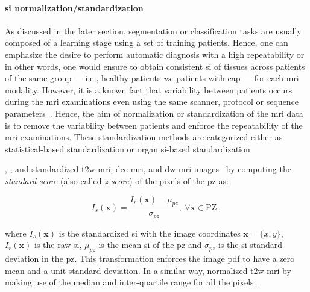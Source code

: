 \paragraph{\Ac{si} normalization/standardization} As discussed in the later section, segmentation or classification tasks are usually composed of a learning stage using a set of training patients.
Hence, one can emphasize the desire to perform automatic diagnosis with a high repeatability or in other words, one would ensure to obtain consistent \ac{si} of tissues across patients of the same group --- i.e., healthy patients \textit{vs.} patients with \ac{cap} --- for each \ac{mri} modality.
However, it is a known fact that variability between patients occurs during the \ac{mri} examinations even using the same scanner, protocol or sequence parameters~\cite{Nyul1999}.
Hence, the aim of normalization or standardization of the \ac{mri} data is to remove the variability between patients and enforce the repeatability of the \ac{mri} examinations.
These standardization methods are categorized either as statistical-based standardization or organ \ac{si}-based standardization

\citeauthor{Artan2010}, \citeauthor{Ozer2010}, and \citeauthor{rampun2016quantitative} standardized \ac{t2w}-\ac{mri}, \ac{dce}-\ac{mri}, and \ac{dw}-\ac{mri} images~\cite{Artan2009,Artan2010,Ozer2009,Ozer2010,rampun2015classifying,rampun2015computer,rampun2016computer,rampun2016computerb,rampun2016quantitative} by computing the \textit{standard score} (also called \textit{z-score}) of the pixels of the \ac{pz} as:

\begin{equation}
	I_s(\mathbf{x}) = \frac{ I_r(\mathbf{x}) - \mu_{pz}}{\sigma_{pz}}, \ \forall \mathbf{x} \in \text{PZ} \ ,
	\label{eq:meansta}
\end{equation}

\noindent where $I_s(\mathbf{x})$ is the standardized \ac{si} with the image coordinates $\mathbf{x} = \{x,y\}$, $I_r(\mathbf{x})$ is the raw \ac{si}, $\mu_{pz}$ is the mean \ac{si} of the \ac{pz} and $\sigma_{pz}$ is the \ac{si} standard deviation in the \ac{pz}.
This transformation enforces the image \ac{pdf} to have a zero mean and a unit standard deviation.
In a similar way, \citeauthor{Liu2013} normalized \ac{t2w}-\ac{mri} by making use of the median and inter-quartile range for all the pixels~\cite{Liu2013}.

